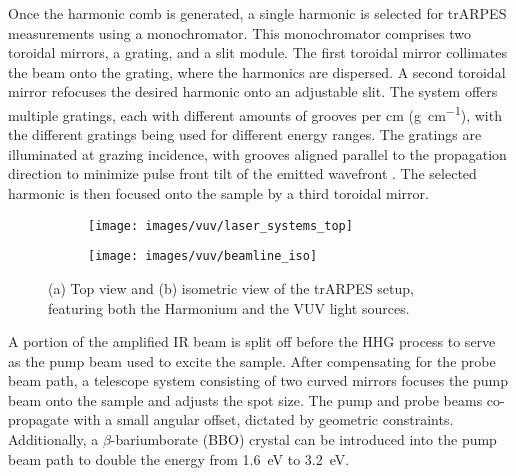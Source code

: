 Once the harmonic comb is generated, a single harmonic is selected for trARPES measurements using a monochromator.
This monochromator comprises two toroidal mirrors, a grating, and a slit module.
The first toroidal mirror collimates the beam onto the grating, where the harmonics are dispersed.
A second toroidal mirror refocuses the desired harmonic onto an adjustable slit.
The system offers multiple gratings, each with different amounts of grooves per \unit{cm} (\unit{g\per\cm}), with the different gratings being used for different energy ranges.
The gratings are illuminated at grazing incidence, with grooves aligned parallel to the propagation direction to minimize pulse front tilt of the emitted wavefront \cite{poletto_time-preserving_2010}.
The selected harmonic is then focused onto the sample by a third toroidal mirror.

\begin{figure}
	\centering
	\begin{subfigure}[b]{0.45\textwidth}
		\texttt{[image: images/vuv/laser\_systems\_top]}
		\caption{}
	\end{subfigure}
	\begin{subfigure}[b]{0.45\textwidth}
		\texttt{[image: images/vuv/beamline\_iso]}
		\caption{}
	\end{subfigure}
	\caption{(a) Top view and (b) isometric view of the trARPES setup, featuring both the Harmonium and the VUV light sources.}
	\label{fig:beamline_cad}
\end{figure}

A portion of the amplified IR beam is split off before the HHG process to serve as the pump beam used to excite the sample.
After compensating for the probe beam path, a telescope system consisting of two curved mirrors focuses the pump beam onto the sample and adjusts the spot size.
The pump and probe beams co-propagate with a small angular offset, dictated by geometric constraints.
Additionally, a $\beta$-bariumborate (BBO) crystal can be introduced into the pump beam path to double the energy from \qty{1.6}{\electronvolt} to \qty{3.2}{\electronvolt}.

